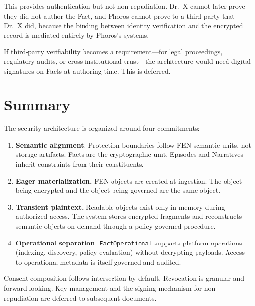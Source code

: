 \documentclass[11pt]{article}
\begin{document}
This provides authentication but not non-repudiation. Dr.~X cannot
later prove they did not author the Fact, and Phoros cannot prove to a
third party that Dr.~X did, because the binding between identity
verification and the encrypted record is mediated entirely by Phoros's
systems.

If third-party verifiability becomes a requirement---for legal
proceedings, regulatory audits, or cross-institutional trust---the
architecture would need digital signatures on Facts at authoring time.
This is deferred.

\section{Summary}

The security architecture is organized around four commitments:

\begin{enumerate}

\item \textbf{Semantic alignment.} Protection boundaries follow FEN
  semantic units, not storage artifacts. Facts are the cryptographic
  unit. Episodes and Narratives inherit constraints from their
  constituents.

\item \textbf{Eager materialization.} FEN objects are created at
  ingestion. The object being encrypted and the object being governed
  are the same object.

\item \textbf{Transient plaintext.} Readable objects exist only in
  memory during authorized access. The system stores encrypted
  fragments and reconstructs semantic objects on demand through a
  policy-governed procedure.

\item \textbf{Operational separation.} \texttt{FactOperational}
  supports platform operations (indexing, discovery, policy evaluation)
  without decrypting payloads. Access to operational metadata is itself
  governed and audited.

\end{enumerate}

Consent composition follows intersection by default. Revocation is
granular and forward-looking. Key management and the signing mechanism
for non-repudiation are deferred to subsequent documents.
\end{document}
